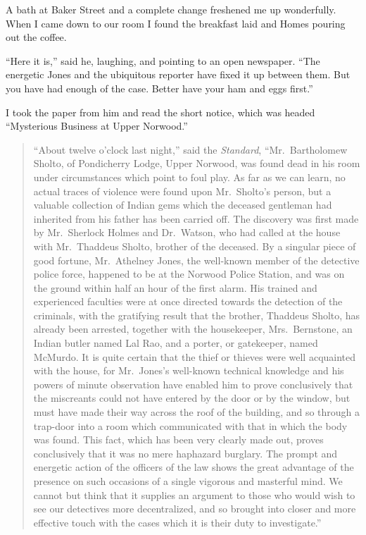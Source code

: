 \documentclass[12pt,english,oneside]{book}
\begin{document}
A bath at Baker Street and a complete change freshened me up wonderfully.
When I came down to our room I found the breakfast laid and Homes
pouring out the coffee.

{}``Here it is,'' said he, laughing, and pointing to an open newspaper.
{}``The energetic Jones and the ubiquitous reporter have fixed it
up between them. But you have had enough of the case. Better have
your ham and eggs first.''

I took the paper from him and read the short notice, which was headed
{}``Mysterious Business at Upper Norwood.''

\begin{quote}

``About twelve o'clock last night,'' said the \textit{Standard}, ``Mr.\ Bartholomew Sholto, of Pondicherry Lodge, Upper Norwood, was found dead in his room under circumstances which point to foul play. As far as we can learn, no actual traces of violence were found upon Mr.\ Sholto's person, but a valuable collection of Indian gems which the deceased gentleman had inherited from his father has been carried off. The discovery was first made by Mr.\ Sherlock Holmes and Dr.\ Watson, who had called at the house with Mr.\ Thaddeus Sholto, brother of the deceased. By a singular piece of good fortune, Mr.\ Athelney Jones, the well-known member of the detective police force, happened to be at the Norwood Police Station, and was on the ground within half an hour of the first alarm. His trained and experienced faculties were at once directed towards the detection of the criminals, with the gratifying result that the brother, Thaddeus Sholto, has already been arrested, together with the housekeeper, Mrs.\ Bernstone, an Indian butler named Lal Rao, and a porter, or gatekeeper, named McMurdo. It is quite certain that the thief or thieves were well acquainted with the house, for Mr.\ Jones's well-known technical knowledge and his powers of minute observation have enabled him to prove conclusively that the miscreants could not have entered by the door or by the window, but must have made their way across the roof of the building, and so through a trap-door into a room which communicated with that in which the body was found. This fact, which has been very clearly made out, proves conclusively that it was no mere haphazard burglary. The prompt and energetic action of the officers of the law shows the great advantage of the presence on such occasions of a single vigorous and masterful mind. We cannot but think that it supplies an argument to those who would wish to see our detectives more decentralized, and so brought into closer and more effective touch with the cases which it is their duty to investigate.''

\end{quote}
\end{document}
